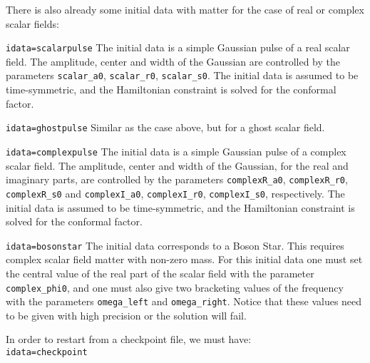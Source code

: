 \documentclass[12pt]{article}
\begin{document}
There is also already some initial data with matter for the case of
real or complex scalar fields:

\begin{list}{}{
\setlength{\leftmargin}{55mm}
\setlength{\labelsep}{10mm}
\setlength{\labelwidth}{45mm}}

\item[\texttt{idata=scalarpulse}] The initial data is a simple
  Gaussian pulse of a real scalar field.  The amplitude, center and
  width of the Gaussian are controlled by the parameters
  \texttt{scalar\_a0}, \texttt{scalar\_r0}, \texttt{scalar\_s0}.  The
  initial data is assumed to be time-symmetric, and the Hamiltonian
  constraint is solved for the conformal factor.

\item[\texttt{idata=ghostpulse}] Similar as the case above, but for a
  ghost scalar field.

\item[\texttt{idata=complexpulse}] The initial data is a simple
  Gaussian pulse of a complex scalar field.  The amplitude, center and
  width of the Gaussian, for the real and imaginary parts, are
  controlled by the parameters \texttt{complexR\_a0},
  \texttt{complexR\_r0}, \texttt{complexR\_s0} and
  \texttt{complexI\_a0}, \linebreak \texttt{complexI\_r0},
  \texttt{complexI\_s0}, respectively.  The initial data is assumed to
  be time-symmetric, and the Hamiltonian constraint is solved for the
  conformal factor.

\item[\texttt{idata=bosonstar}] The initial data corresponds to a
  Boson Star.  This requires complex scalar field matter with non-zero
  mass. For this initial data one must set the central value of the
  real part of the scalar field with the parameter
  \texttt{complex\_phi0}, and one must also give two bracketing values
  of the frequency with the parameters \texttt{omega\_left} and
  \texttt{omega\_right}.  Notice that these values need to be given
  with high precision or the solution will fail.

\end{list}

In order to restart from a checkpoint file, we must have: \\

\texttt{idata=checkpoint} 

\vspace{3mm}


\end{document}
